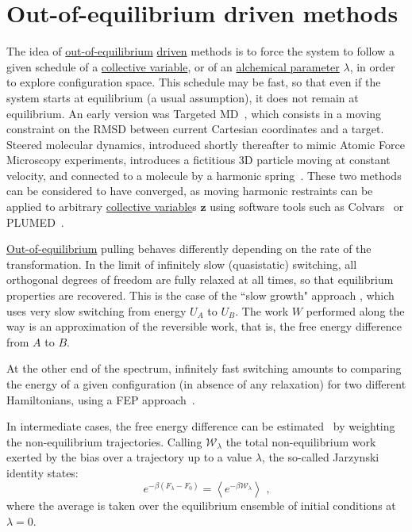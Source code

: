 \documentclass[9pt,review]{livecoms}
\newcommand{\vz}{\mathbf{z}}
\begin{document}
\section{Out-of-equilibrium driven methods}

The idea of \hyperlink{ref:OutOfEq} {out-of-equilibrium} \hyperlink{ref:Driven} {driven} methods is to force the system to follow a given schedule of a \hyperlink{ref:CV} {collective variable}, or of an \hyperlink{ref:AuxVar} {alchemical parameter} $\lambda$, in order to explore configuration space. This schedule may be fast, so that even if the system starts at equilibrium (a usual assumption), it does not remain at equilibrium.
An early version was Targeted MD~\cite{Schlitter1994}, which consists in a moving constraint on the RMSD between current Cartesian coordinates and a target.
Steered molecular dynamics, introduced shortly thereafter to mimic Atomic Force Microscopy experiments, introduces a fictitious 3D particle moving at constant velocity, and connected to a molecule by a harmonic spring~\cite{Grubmueller1996}.
These two methods can be considered to have converged, as moving harmonic restraints can be applied to arbitrary \hyperlink{ref:CV} {collective variable}s $\vz$ using software tools such as Colvars~\cite{Fiorin2013} or PLUMED~\cite{Tribello2014}.

\hyperlink{ref:OutOfEq} {Out-of-equilibrium} pulling behaves differently depending on the rate of the transformation.
In the limit of infinitely slow (quasistatic) switching, all orthogonal degrees of freedom are fully relaxed at all times, so that equilibrium properties are recovered.
This is the case of the ``slow growth" approach \cite{Postma1982}, which uses very slow switching from energy $U_A$ to $U_B$. The work $W$ performed along the way is an approximation of the reversible work, that is, the free energy difference from $A$ to $B$.

At the other end of the spectrum, infinitely fast switching amounts to comparing the energy of a given configuration (in absence of any relaxation) for two different Hamiltonians, using a \hypertarget{ref:FEP} {FEP} approach~\cite{Kirkwood1935,Zwanzig1954}.


In intermediate cases, the free energy difference can be estimated~\cite{jarzynski-97} by weighting the non-equilibrium trajectories.
Calling $\mathcal W_\lambda$ the total non-equilibrium work exerted by the bias over a trajectory up to a value $\lambda$, the so-called Jarzynski identity states:
\begin{equation}
\label{eq:jarz}
e^{-\beta (F_\lambda - F_0)} = \left\langle e^{-\beta \mathcal W_\lambda}\right\rangle \text{ ,}
\end{equation}
where the average is taken over the equilibrium ensemble of initial conditions at $\lambda = 0$.
\end{document}

